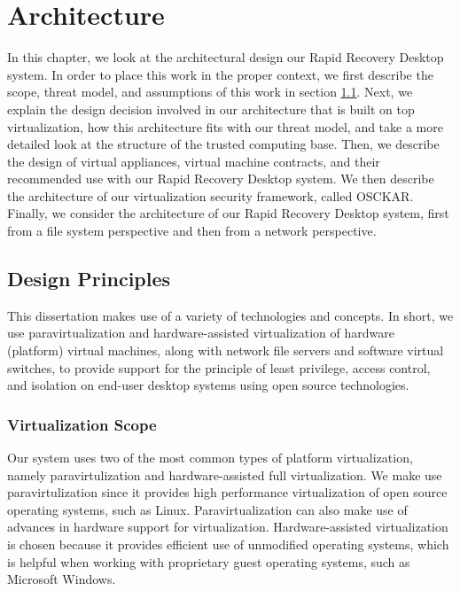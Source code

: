 
\chapter{Architecture}

In this chapter, we look at the architectural design our Rapid Recovery Desktop system. In order to place this work in the proper context, we first describe the scope, threat model, and assumptions of this work in section \ref{sec:scope}. Next, we explain the design decision involved in our architecture that is built on top virtualization, how this architecture fits with our threat model, and take a more detailed look at the structure of the trusted computing base. Then, we describe the design of virtual appliances, virtual machine contracts, and their recommended use with our Rapid Recovery Desktop system. We then describe the architecture of our virtualization security framework, called OSCKAR. Finally, we consider the architecture of our Rapid Recovery Desktop system, first from a file system perspective and then from a network perspective.

\section{Design Principles}
\label{sec:scope}

This dissertation makes use of a variety of technologies and concepts. In short, we use paravirtualization and hardware-assisted virtualization of hardware (platform) virtual machines, along with network file servers and software virtual switches, to provide support for the principle of least privilege, access control, and isolation on end-user desktop systems using open source technologies.

\subsection{Virtualization Scope}

Our system uses two of the most common types of platform virtualization, namely paravirtulization and hardware-assisted full virtualization. We make use paravirtulization since it provides high performance virtualization of open source operating systems, such as Linux. Paravirtualization can also make use of advances in hardware support for virtualization. Hardware-assisted virtualization is chosen because it provides efficient use of unmodified operating systems, which is helpful when working with proprietary guest operating systems, such as Microsoft Windows.

